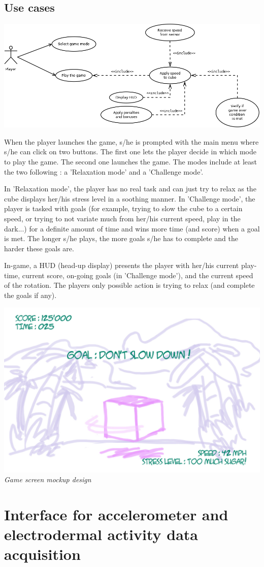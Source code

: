 \documentclass[12pt,a4paper]{article}
\begin{document}
\subsection{Use cases}

\includegraphics[width=\textwidth,height=\textheight,keepaspectratio]{graph/useCase.png}

When the player launches the game, s/he is prompted with the main menu where s/he can click on two buttons. The first one lets the player decide in which mode to play the game. The second one launches the game. The modes include at least the two following : a 'Relaxation mode' and a 'Challenge mode'. 

In 'Relaxation mode', the player has no real task and can just try to relax as the cube displays her/his stress level in a soothing manner. In 'Challenge mode', the player is tasked with goals (for example, trying to slow the cube to a certain speed, or trying to not variate much from her/his current speed, play in the dark...) for a definite amount of time and wins more time (and score) when a goal is met. The longer s/he plays, the more goals s/he has to complete and the harder these goals are.

In-game, a HUD (head-up display) presents the player with her/his current play-time, current score, on-going goals (in 'Challenge mode'), and the current speed of the rotation. The players only possible action is trying to relax (and complete the goals if any). 

\begin{center}
\includegraphics[width=\textwidth,height=\textheight,keepaspectratio]{graph/mockup1.jpg}
\textit{Game screen mockup design}
\end{center}

\clearpage
\section{Interface for accelerometer and electrodermal activity 
 data acquisition}
\end{document}
